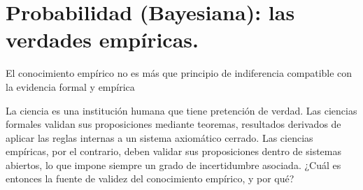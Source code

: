 \documentclass[a4paper,10pt]{book}
\theoremstyle{definition}
\begin{document}
% 
% 
% 
% 
% 
% 
% 
% 
% 






























































\chapter{Probabilidad (Bayesiana): las verdades emp\'iricas.} \label{ch:proba}

\epigraph{El conocimiento emp\'irico no es m\'as que principio de indiferencia compatible con la evidencia formal y emp\'irica}{}

La ciencia es una instituci\'on humana que tiene pretenci\'on de verdad.
%
Las ciencias formales validan sus proposiciones mediante teoremas, resultados derivados de aplicar las reglas internas a un sistema axiom\'atico cerrado.
%
Las ciencias emp\'iricas, por el contrario, deben validar sus proposiciones dentro de sistemas abiertos, lo que impone siempre un grado de incertidumbre asociada.
%
¿Cu\'al es entonces la fuente de validez del conocimiento emp\'irico, y por qu\'e?
\end{document}
